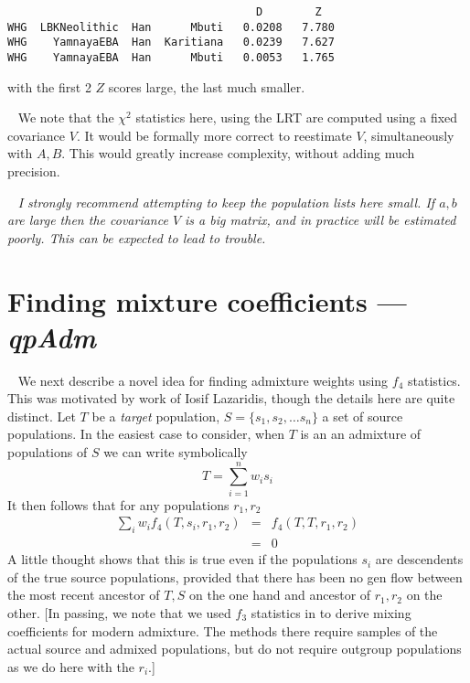 \documentclass{article} %
\newcommand  {\nld }  {{\ \newline \noindent}}
\newcommand  {\qpa }  {{\em qpAdm }}
\begin{document}
\begin{verbatim}
                                      D        Z
WHG  LBKNeolithic  Han      Mbuti   0.0208   7.780  
WHG    YamnayaEBA  Han  Karitiana   0.0239   7.627 
WHG    YamnayaEBA  Han      Mbuti   0.0053   1.765 
\end{verbatim}
with the first 2 $Z$ scores large, the last much smaller.

\nld
We note that the $\chi^2$ statistics here, using the LRT are computed using a fixed covariance $V$.  It would be formally 
more correct to reestimate $V$,  simultaneously with $A, B$.  This would greatly increase complexity, without 
adding much precision.  

\nld
{
\em I strongly recommend attempting to keep the population lists here small.  If $a, b$ are large then the covariance $V$ is 
a big matrix, and in practice will be estimated poorly.  This can be expected to lead to trouble. 
}

\section{Finding mixture coefficients --- \qpa}
\nld
We next describe a novel idea for finding admixture weights using $f_4$ statistics.  
This was motivated by work of Iosif Lazaridis, though the details here are quite distinct. 
Let $T$ be a {\em target} population, $S = \{s_1, s_2, \ldots s_n \}$ a set of source populations.  
In the easiest case to consider, when $T$ is an an admixture of populations of $S$ we can 
write symbolically 
\[
T = \sum_{i=1}^n w_i s_i 
\] 
It then follows that for any populations $r_1, r_2$ 
\begin{eqnarray*} 
\sum_i w_i f_4(T, s_i, r_1, r_2) & = & f_4(T, T, r_1, r_2)  \\
& = & 0 
\end{eqnarray*}
A little thought shows that this is true even if 
the populations $s_i$ are descendents of the true source populations, 
provided that there has been no gen flow between the most recent ancestor of $T, S$ on the one hand 
and ancestor of $r_1, r_2$ on the other.  
[In passing, we note that we used $f_3$ statistics in \cite{capec1} to derive mixing coefficients
for modern admixture.  The methods there require samples of the actual source and admixed populations, 
but do not require outgroup populations as we do here with the $r_i$.]
\end{document}
